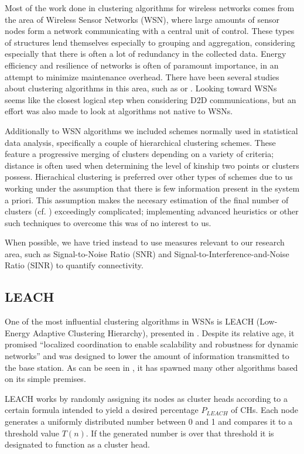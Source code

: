 Most of the work done in clustering algorithms for wireless networks comes from the area of Wireless Sensor Networks (WSN), where large amounts of sensor nodes form a network communicating with a central unit of control. These types of structures lend themselves especially to grouping and aggregation, considering especially that there is often a lot of redundancy in the collected data. Energy efficiency and resilience of networks is often of paramount importance, in an attempt to minimize maintenance overhead. There have been several studies about clustering algorithms in this area, such as \cite{Jiang2009} or \cite{Afsar2014}. Looking toward WSNs seems like the closest logical step when considering D2D communications, but an effort was also made to look at algorithms not native to WSNs.

Additionally to WSN algorithms we included schemes normally used in statistical data analysis, specifically a couple of hierarchical clustering schemes. These feature a progressive merging of clusters depending on a variety of criteria; distance is often used when determining the level of kinship two points or clusters possess. Hierachical clustering is preferred over other types of schemes due to us working under the assumption that there is few information present in the system a priori. This assumption makes the necesary estimation of the final number of clusters (cf. \cite{Everitt2011}) exceedingly complicated; implementing advanced heuristics or other such techniques to overcome this was of no interest to us.

When possible, we have tried instead to use measures relevant to our research area, such as Signal-to-Noise Ratio (SNR) and Signal-to-Interference-and-Noise Ratio (SINR) to quantify connectivity. 

\subsection{LEACH} \label{LEACH}
One of the most influential clustering algorithms in WSNs is LEACH (Low-Energy Adaptive Clustering Hierarchy), presented in \cite{Heinzelman2000}. Despite its relative age, it promised ``localized coordination to enable scalability and robustness for dynamic networks'' and was designed to lower the amount of information transmitted to the base station. As can be seen in \cite{Afsar2014}, it has spawned many other algorithms based on its simple premises. 

LEACH works by randomly assigning its nodes as cluster heads according to a certain formula intended to yield a desired percentage $P_{LEACH}$ of CHs. Each node generates a uniformly distributed number between 0 and 1 and compares it to a threshold value $T(n)$. If the generated number is over that threshold it is designated to function as a cluster head.

